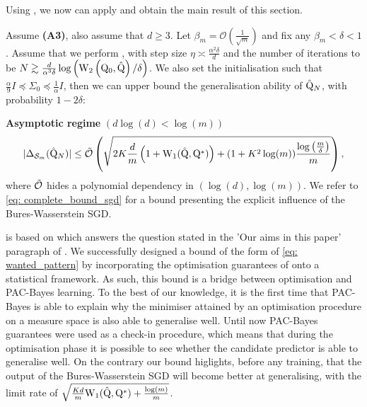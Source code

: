 Using , we now can apply  and obtain the main result of this section.
\begin{theorem}
\label{th: main_sgd}
Assume \textbf{(A3)}, also assume that $d\geq 3$. Let $\beta_m= \mathcal{O}(\frac{1}{\sqrt{m}})$ and fix any $\beta_m<\delta<1$.
Assume that we perform , with step size $\eta \asymp \frac{\alpha^2 \delta}{d}$ and the number of iterations to be $N \gtrsim \frac{d}{\alpha^3 \delta} \log \left(\mathrm{W}_{2}\left(\mathrm{Q}_0, \hat{\mathrm{Q}}\right) / \delta\right)$.
We also set the initialisation such that $\frac{\alpha}{9} I \preceq \Sigma_{0} \preceq \frac{1}{\alpha} I$,
then we can upper bound the generalisation ability of $\hat{\mathrm{Q}}_N$, with probability $1-2\delta$:

\noindent \textbf{Asymptotic regime} $(d\log(d)< \log(m))$
\begin{align*}
|\Delta_{\mathcal{S}_m}(\hat{\mathrm{Q}}_N)|  \leq\Tilde{\mathcal{O}}\left( \sqrt{2K\frac{d}{m}\left(1 + \mathrm{W}_{1}(\hat{\mathrm{Q}},\mathrm{Q}^*)\right)+ (1+K^2\log(m)) \frac{\log\left( \frac{m}{\delta} \right)}{m}} \right),
\end{align*}
where $\Tilde{\mathcal{O}}$ hides a polynomial dependency in $(\log(d),\log(m))$. We refer to \eqref{eq: complete_bound_sgd} for a bound presenting the explicit influence of the Bures-Wasserstein SGD.
\end{theorem}
 is based on  which answers the question stated in the 'Our aims in this paper' paragraph of . We successfully designed a bound of the form of \eqref{eq: wanted_pattern} by incorporating the optimisation guarantees of \citet{lambert2022variational} onto a statistical framework.
As such, this bound is a bridge between optimisation and PAC-Bayes learning. To the best of our knowledge, it is the first time that PAC-Bayes is able to explain why the minimiser attained by an optimisation procedure on a measure space is also able to generalise well. Until now PAC-Bayes guarantees were used as a check-in procedure, which means that during the optimisation phase it is possible to see whether the candidate predictor is able to generalise well. On the contrary our bound higlights, before any training, that the output of the Bures-Wasserstein SGD will become better at generalising, with the limit rate of $\sqrt{\frac{Kd}{m}\mathrm{W}_{1}(\hat{\mathrm{Q}},\mathrm{Q}^*) + \frac{\log(m)}{m}}$.
\medskip

